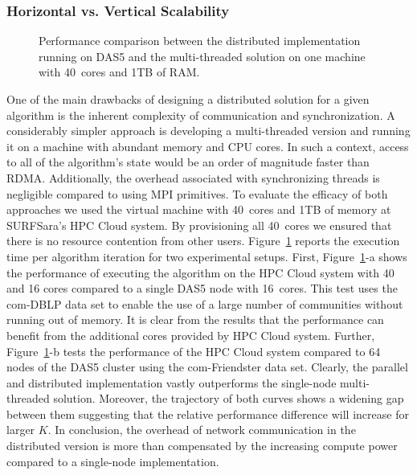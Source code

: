 \subsubsection{Horizontal vs. Vertical Scalability}
\begin{figure}[tb] %
  \centering
  \caption{Performance comparison between the distributed implementation
  running on DAS5 and the multi-threaded solution on one machine with 40~cores and
  1TB of RAM.}
  \label{fig-scale-up}
\end{figure}
One of the main drawbacks of designing a distributed solution for a given
algorithm is the inherent complexity of communication and synchronization. A
considerably simpler approach is developing a multi-threaded version and
running it on a machine with abundant memory and CPU cores. In such a context,
access to all of the algorithm's state would be an order of magnitude faster
than RDMA. Additionally, the overhead associated with synchronizing threads is
negligible compared to using MPI primitives. To evaluate the efficacy of both
approaches we used the virtual
machine with 40~cores and 1TB of
memory at SURFSara's HPC Cloud system. By provisioning all 40~cores
we ensured that there is no
resource contention from other users. Figure~\ref{fig-scale-up}
reports the execution time per algorithm iteration for two experimental setups.
%
First, Figure~\ref{fig-scale-up}-a shows the performance of executing the
algorithm on the HPC Cloud
system with 40 and 16 cores compared to a single DAS5 node with 16~cores. This
test uses the com-DBLP data set to enable the use of a large number of
communities without running out of memory. It is clear from the results that
the performance can benefit from the additional cores provided by HPC Cloud system.
%
Further, Figure~\ref{fig-scale-up}-b tests the performance of the HPC Cloud
system compared to 64 nodes of the DAS5
cluster using the com-Friendster data set. Clearly, the parallel and
distributed implementation vastly
outperforms the single-node multi-threaded solution. Moreover, the trajectory
of both curves shows a widening gap between them suggesting that the relative
performance difference will increase for larger $K$.
%
In conclusion, the overhead of network communication in the distributed version
is more than compensated by the increasing compute power compared to
a single-node implementation.

